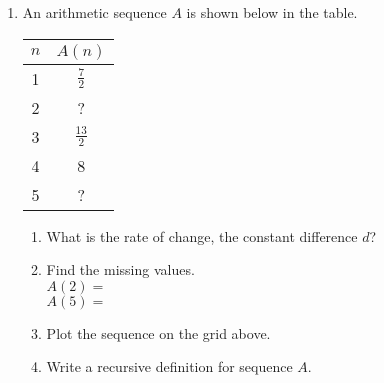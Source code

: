 \documentclass[12pt, twoside]{article}
\begin{document}
\begin{enumerate}
\newpage
\item An arithmetic sequence $A$ is shown below in the table.
    \begin{multicols}{2}
        \renewcommand{\arraystretch}{2}
        \begin{table}[H]
        \begin{tabular}{c|c}
            $n$ & $A(n)$ \\ \hline
            1 & $\displaystyle \frac{7}{2}$ \\ 
            2 & ? \\ 
            3 & $\displaystyle \frac{13}{2}$ \\ 
            4 & 8 \\ 
            5 & ? \\ 
        \end{tabular}
    \end{table} \vspace{2cm}
    \columnbreak
    \end{multicols}
    \begin{enumerate}[itemsep=1cm]
        \item What is the rate of change, the constant difference $d$?
        \item Find the missing values. \\[0.5cm]
            $A(2)=$ \\[0.5cm] 
            $A(5)=$
        \item Plot the sequence on the grid above.
        \item Write a recursive definition for sequence $A$.
    \end{enumerate}


\end{enumerate}
\end{document}
